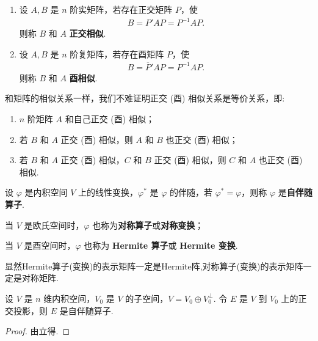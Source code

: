 \documentclass[../../main.tex]{subfiles}%
\begin{document}
\begin{definition}[正交相似和酉相似]
\begin{enumerate}
\item 设 $A,B$ 是 $n$ 阶实矩阵，若存在正交矩阵 $P$，使 
\begin{align*}
B = P'AP=P^{-1}AP.
\end{align*}
则称 $B$ 和 $A$ \textbf{正交相似}. 

\item 设 $A,B$ 是 $n$ 阶复矩阵，若存在酉矩阵 $P$，使 
\begin{align*}
B = \overline{P}'AP=P^{-1}AP.
\end{align*}
则称 $B$ 和 $A$ \textbf{酉相似}.
\end{enumerate}
\end{definition}
\begin{remark}
和矩阵的相似关系一样，我们不难证明正交 (酉) 相似关系是等价关系，即:
\begin{enumerate}
\item $n$ 阶矩阵 $A$ 和自己正交 (酉) 相似；

\item 若 $B$ 和 $A$ 正交 (酉) 相似，则 $A$ 和 $B$ 也正交 (酉) 相似；

\item 若 $B$ 和 $A$ 正交 (酉) 相似，$C$ 和 $B$ 正交 (酉) 相似，则 $C$ 和 $A$ 也正交 (酉) 相似. 
\end{enumerate}
\end{remark}

\begin{definition}[自伴随算子]
设 $\varphi$ 是内积空间 $V$ 上的线性变换，$\varphi^*$ 是 $\varphi$ 的伴随，若 $\varphi^* = \varphi$，则称 $\varphi$ 是\textbf{自伴随算子}. 

当 $V$ 是欧氏空间时，$\varphi$ 也称为\textbf{对称算子}或\textbf{对称变换}；

当 $V$ 是酉空间时，$\varphi$ 也称为 \textbf{Hermite 算子}或 \textbf{Hermite 变换}.
\end{definition}
\begin{remark}
显然Hermite算子(变换)的表示矩阵一定是Hermite阵,对称算子(变换)的表示矩阵一定是对称矩阵.
\end{remark}

\begin{proposition}
设 $V$ 是 $n$ 维内积空间，$V_0$ 是 $V$ 的子空间，$V = V_0 \oplus V_0^\perp$. 令 $E$ 是 $V$ 到 $V_0$ 上的正交投影，则 $E$ 是自伴随算子. 
\end{proposition}
\begin{proof}

由立得.

\end{proof}
\end{document}
